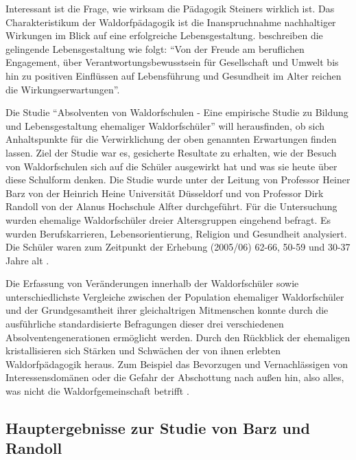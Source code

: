 Interessant ist die Frage, wie wirksam die Pädagogik Steiners wirklich ist. Das Charakteristikum der Waldorfpädagogik ist die Inanspruchnahme nachhaltiger Wirkungen im Blick auf eine erfolgreiche Lebensgestaltung. \citet[][S. 13]{randoll07} beschreiben die gelingende Lebensgestaltung wie folgt: \enquote{Von der Freude am beruflichen Engagement, über Verantwortungsbewusstsein für Gesellschaft und Umwelt bis hin zu positiven Einflüssen auf Lebensführung und Gesundheit im Alter reichen die Wirkungserwartungen}.

Die Studie \enquote{Absolventen von Waldorfschulen - Eine empirische Studie zu Bildung und Lebensgestaltung ehemaliger Waldorfschüler} will herausfinden, ob sich Anhaltspunkte für die Verwirklichung der oben genannten Erwartungen finden lassen.
Ziel der Studie war es, gesicherte Resultate zu erhalten, wie der Besuch von Waldorfschulen sich auf die Schüler ausgewirkt hat und was sie heute über diese Schulform denken.
Die Studie wurde unter der Leitung von Professor Heiner Barz von der Heinrich Heine Universität Düsseldorf und von Professor Dirk Randoll von der Alanus Hochschule Alfter durchgeführt. 
Für die Untersuchung wurden ehemalige Waldorfschüler dreier Altersgruppen eingehend befragt. 
Es wurden Berufskarrieren, Lebensorientierung, Religion und Gesundheit analysiert. 
Die Schüler waren zum Zeitpunkt der Erhebung (2005/06) 62-66, 50-59 und 30-37 Jahre alt \citep[vgl.][]{randoll07, paschen10}.

Die Erfassung von Veränderungen innerhalb der Waldorfschüler sowie unterschiedlichste Vergleiche zwischen der Population ehemaliger Waldorfschüler und der Grundgesamtheit ihrer gleichaltrigen Mitmenschen konnte durch die ausführliche standardisierte Befragungen dieser drei verschiedenen Absolventengenerationen ermöglicht werden. Durch den Rückblick der ehemaligen kristallisieren sich Stärken und Schwächen der von ihnen erlebten Waldorfpädagogik heraus. Zum Beispiel das Bevorzugen und Vernachlässigen von Interessensdomänen oder die Gefahr der Abschottung nach außen hin, also alles, was nicht die Waldorfgemeinschaft betrifft \citep[vgl.][S. 12]{randoll07}.

\subsection{Hauptergebnisse zur Studie von Barz und Randoll} %
\label{sub:hauptergebnisse}



